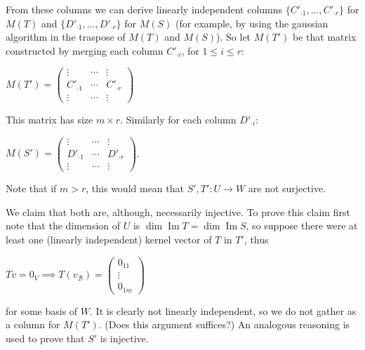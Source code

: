 \documentclass{article}
\theoremstyle{remark}
\begin{document}
\begin{enumerate}
        From these columns we can derive linearly independent columns $\{C'_{\cdot 1}, \dots, C'_{\cdot r}\}$ for $M(T)$ and $\{D'_{\cdot 1}, \dots, D'_{\cdot r}\}$ for $M(S)$ (for example, by using the gaussian algorithm in the traspose of $M(T)$ and $M(S)$).
        So let $M(T')$ be that matrix constructed by merging each column $C'_{\cdot i}$, for $1\leq i \leq r$:
        \begin{center}
            $ M(T') =
            \begin{pmatrix}
                \vdots & \cdots & \vdots \\
                C'_{\cdot 1} & \cdots & C'_{\cdot r} \\
                \vdots & \cdots & \vdots
            \end{pmatrix}$
        \end{center}
        This matrix has size $m \times r$. Similarly for each column $D'_{\cdot i}$:
        \begin{center}
            $ M(S') =
            \begin{pmatrix}
                \vdots & \cdots & \vdots \\
                D'_{\cdot 1} & \cdots & D'_{\cdot r} \\
                \vdots & \cdots & \vdots
            \end{pmatrix}$.
        \end{center}
        Note that if $m > r$, this would mean that $S', T': U \to W$ are not surjective. 
        
        We claim that both are, although, necessarily injective.
        To prove this claim first note that the dimension of $U$ is $\dim \operatorname{Im }T = \dim \operatorname{Im }S$, so suppose there were
        at least one (linearly independent) kernel vector of $T$ in $T'$, thus 
        \begin{center}
            $Tv = 0_V \implies T(v_\mathcal{B}) = 
            \begin{pmatrix}
                0_{11} \\
                \vdots \\
                0_{1m}
            \end{pmatrix}$
        \end{center}
        for some basis of $W$. It is clearly not linearly independent, so we do not gather as a column for $M(T')$. (Does this argument suffices?)
        An analogous reasoning is used to prove that $S'$ is injective.
        

\end{enumerate}
\end{document}
